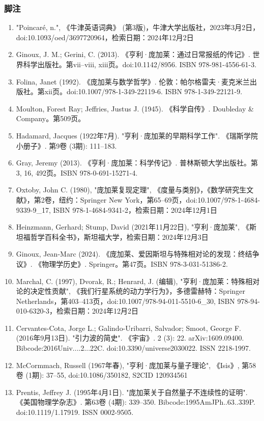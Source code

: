 \subsubsection{脚注}  
\begin{enumerate}
\item "Poincaré, n.", 《牛津英语词典》 (第3版)，牛津大学出版社，2023年3月2日，doi:10.1093/oed/3697720964，检索日期：2024年12月2日  
\item Ginoux, J. M.; Gerini, C. (2013). 《亨利·庞加莱：通过日常报纸的传记》. 世界科学出版社。第vii–viii, xiii页。doi:10.1142/8956. ISBN 978-981-4556-61-3.  
\item Folina, Janet (1992). 《庞加莱与数学哲学》. 伦敦：帕尔格雷夫·麦克米兰出版社。第xii页。doi:10.1007/978-1-349-22119-6. ISBN 978-1-349-22121-9.  
\item Moulton, Forest Ray; Jeffries, Justus J. (1945). 《科学自传》. Doubleday & Company。第509页。  
\item Hadamard, Jacques (1922年7月). "亨利·庞加莱的早期科学工作". 《瑞斯学院小册子》. 第9卷 (3期): 111–183.  
\item Gray, Jeremy (2013). 《亨利·庞加莱：科学传记》. 普林斯顿大学出版社。第3, 16, 492页。ISBN 978-0-691-15271-4.  
\item Oxtoby, John C. (1980), "庞加莱复现定理", 《度量与类别》，《数学研究生文献》，第2卷，纽约：Springer New York，第65–69页，doi:10.1007/978-1-4684-9339-9_17, ISBN 978-1-4684-9341-2，检索日期：2024年12月1日  
\item Heinzmann, Gerhard; Stump, David (2021年11月22日), "亨利·庞加莱", 《斯坦福哲学百科全书》，斯坦福大学，检索日期：2024年12月3日  
\item Ginoux, Jean-Marc (2024). 《庞加莱、爱因斯坦与特殊相对论的发现：终结争议》. 《物理学历史》. Springer。第47页。ISBN 978-3-031-51386-2.  
\item Marchal, C. (1997), Dvorak, R.; Henrard, J. (编辑), "亨利·庞加莱：特殊相对论的决定性贡献", 《我们行星系统的动力学行为》，多德雷赫特：Springer Netherlands，第403–413页，doi:10.1007/978-94-011-5510-6_30, ISBN 978-94-010-6320-3，检索日期：2024年12月2日  
\item Cervantes-Cota, Jorge L.; Galindo-Uribarri, Salvador; Smoot, George F. (2016年9月13日). "引力波的简史". 《宇宙》. 2 (3): 22. arXiv:1609.09400. Bibcode:2016Univ....2...22C. doi:10.3390/universe2030022. ISSN 2218-1997.  
\item McCormmach, Russell (1967年春), "亨利·庞加莱与量子理论", 《Isis》, 第58卷 (1期): 37–55, doi:10.1086/350182, S2CID 120934561  
\item Prentis, Jeffrey J. (1995年4月1日). "庞加莱关于自然量子不连续性的证明". 《美国物理学杂志》. 第63卷 (4期): 339–350. Bibcode:1995AmJPh..63..339P. doi:10.1119/1.17919. ISSN 0002-9505.  

\end{enumerate}
